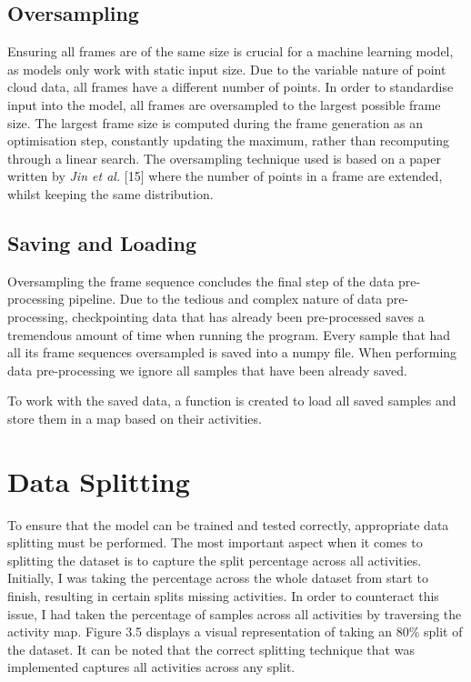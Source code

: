 \subsection{Oversampling}
Ensuring all frames are of the same size is crucial for a machine learning model, as models only work with static input size. Due to the variable nature of point cloud data, all frames have a different number of points. In order to standardise input into the model, all frames are oversampled to the largest possible frame size. The largest frame size is computed during the frame generation as an optimisation step, constantly updating the maximum, rather than recomputing through a linear search. The oversampling technique used is based on a paper written by \textit{Jin et al.} [15] where the number of points in a frame are extended, whilst keeping the same distribution. 

\subsection{Saving and Loading}
Oversampling the frame sequence concludes the final step of the data pre-processing pipeline. Due to the tedious and complex nature of data pre-processing, checkpointing data that has already been pre-processed saves a tremendous amount of time when running the program. Every sample that had all its frame sequences oversampled is saved into a numpy file. When performing data pre-processing we ignore all samples that have been already saved.

To work with the saved data, a function is created to load all saved samples and store them in a map based on their activities. 

\section{Data Splitting}
To ensure that the model can be trained and tested correctly, appropriate data splitting must be performed. The most important aspect when it comes to splitting the dataset is to capture the split percentage across all activities. Initially, I was taking the percentage across the whole dataset from start to finish, resulting in certain splits missing activities. In order to counteract this issue, I had taken the percentage of samples across all activities by traversing the activity map. Figure 3.5 displays a visual representation of taking an 80\% split of the dataset. It can be noted that the correct splitting technique that was implemented captures all activities across any split.

